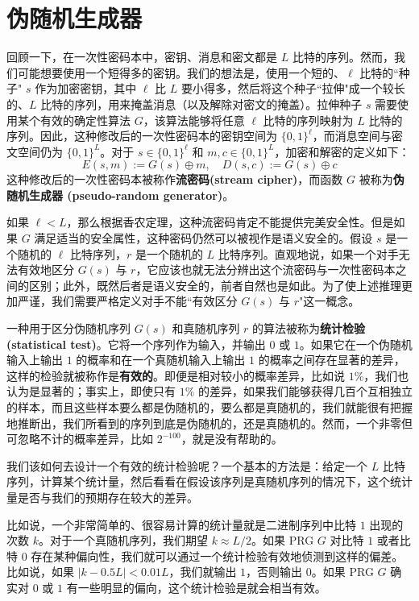\section{伪随机生成器}

回顾一下，在一次性密码本中，密钥、消息和密文都是 $L$ 比特的序列。然而，我们可能想要使用一个短得多的密钥。我们的想法是，使用一个短的、$\ell$ 比特的``种子" $s$ 作为加密密钥，其中 $\ell$ 比 $L$ 要小得多，然后将这个种子``拉伸"成一个较长的、$L$ 比特的序列，用来掩盖消息（以及解除对密文的掩盖）。拉伸种子 $s$ 需要使用某个有效的确定性算法 $G$，该算法能够将任意 $\ell$ 比特的序列映射为 $L$ 比特的序列。因此，这种修改后的一次性密码本的密钥空间为 $\{0,1\}^\ell$，而消息空间与密文空间仍为 $\{0,1\}^L$。对于 $s\in\{0,1\}^\ell$ 和 $m,c\in\{0,1\}^L$，加密和解密的定义如下：
\[
E(s,m):=G(s)\oplus m,\quad
D(s,c):=G(s)\oplus c
\]
这种修改后的一次性密码本被称作\textbf{流密码(stream cipher)}，而函数 $G$ 被称为\textbf{伪随机生成器 (pseudo-random generator)}。

如果 $\ell<L$，那么根据香农定理，这种流密码肯定不能提供完美安全性。但是如果 $G$ 满足适当的安全属性，这种密码仍然可以被视作是语义安全的。假设 $s$ 是一个随机的 $\ell$ 比特序列，$r$ 是一个随机的 $L$ 比特序列。直观地说，如果一个对手无法有效地区分 $G(s)$ 与 $r$，它应该也就无法分辨出这个流密码与一次性密码本之间的区别；此外，既然后者是语义安全的，前者自然也是如此。为了使上述推理更加严谨，我们需要严格定义对手不能``有效区分 $G(s)$ 与 $r$"这一概念。

一种用于区分伪随机序列 $G(s)$ 和真随机序列 $r$ 的算法被称为\textbf{统计检验(statistical test)}。它将一个序列作为输入，并输出 $0$ 或 $1$。如果它在一个伪随机输入上输出 $1$ 的概率和在一个真随机输入上输出 $1$ 的概率之间存在显著的差异，这样的检验就被称作是\textbf{有效的}。即便是相对较小的概率差异，比如说 $1\%$，我们也认为是显著的；事实上，即使只有 $1\%$ 的差异，如果我们能够获得几百个互相独立的样本，而且这些样本要么都是伪随机的，要么都是真随机的，我们就能很有把握地推断出，我们所看到的序列到底是伪随机的，还是真随机的。然而，一个非零但可忽略不计的概率差异，比如 $2^{-100}$，就是没有帮助的。

我们该如何去设计一个有效的统计检验呢？一个基本的方法是：给定一个 $L$ 比特序列，计算某个统计量，然后看看在假设该序列是真随机序列的情况下，这个统计量是否与我们的预期存在较大的差异。

比如说，一个非常简单的、很容易计算的统计量就是二进制序列中比特 $1$ 出现的次数 $k$。对于一个真随机序列，我们期望 $k\approx L/2$。如果 PRG $G$ 对比特 $1$ 或者比特 $0$ 存在某种偏向性，我们就可以通过一个统计检验有效地侦测到这样的偏差。比如说，如果 $|k-0.5L|<0.01L$，我们就输出 $1$，否则输出 $0$。如果 PRG $G$ 确实对 $0$ 或 $1$ 有一些明显的偏向，这个统计检验是就会相当有效。

